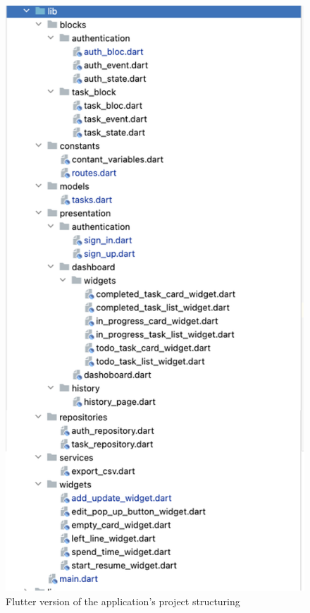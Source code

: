 \begin{figure}[htbp]
    \centering
    \includegraphics[scale = 0.8]{img/flutter_app_str.png}
    \caption{Flutter version of the application’s project structuring}
    \label{fig:flutter_app_str}
\end{figure}
